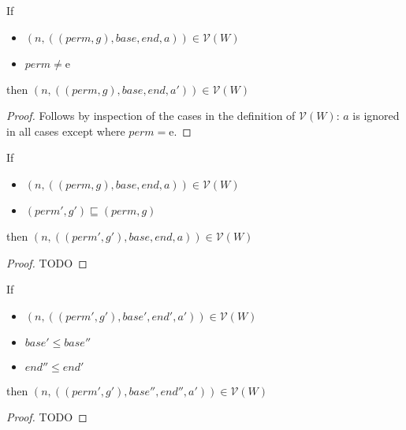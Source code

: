 \documentclass[a4paper]{article}
\newcommand{\var}[1]{\mathit{#1}}
\newcommand{\gl}{\var{g}}
\newcommand{\addr}{\var{a}}
\newcommand{\start}{\var{base}}
\newcommand{\addrend}{\var{end}}
\newcommand{\perm}{\var{perm}}
\newcommand{\asmType}{\plaindom{AsmType}}
\newcommand{\plaindom}[1]{\mathrm{#1}}
\newcommand{\intr}[2]{\mathcal{#1}}
\newcommand{\valueintr}[1]{\intr{V}{#1}}
\newcommand{\stdvr}{\valueintr{\asmType}}
\newcommand{\npair}[2][n]{\left(#1,#2 \right)}
\newcommand{\plainperm}[1]{\mathrm{#1}}
\newcommand{\entry}{\plainperm{e}}
\begin{document}
 \begin{lemma}
   \label{lem:conds-lea-suffice}
   If
   \begin{itemize}
   \item $\npair{((\perm,\gl),\start,\addrend,\addr)}\in\stdvr(W)$
   \item $\perm \neq \entry$
   \end{itemize}
 
   then $\npair{((\perm,\gl),\start,\addrend,\addr')} \in \stdvr(W)$
 \end{lemma}
 \begin{proof}
   Follows by inspection of the cases in the definition of $\stdvr(W)$: $a$ is
   ignored in all cases except where $\perm = \entry$.
 \end{proof}
 
 \begin{lemma}
   \label{lem:conds-restrict-suffice}
   If
   \begin{itemize}
   \item $\npair{((\perm,\gl),\start,\addrend,\addr)}\in\stdvr(W)$
   \item $(\perm',\gl')\sqsubseteq (\perm,\gl)$
   \end{itemize}
 
   then  $\npair{((\perm',\gl'),\start,\addrend,\addr)}\in \stdvr(W)$
 \end{lemma}
 \begin{proof}
   TODO
 \end{proof}
 
 \begin{lemma}
   \label{lem:conds-subseg-suffice}
   If
   \begin{itemize}
   \item $\npair{((\perm',\gl'),\start',\addrend',\addr')} \in \stdvr(W)$
   \item $\start' \leq \start''$
   \item $\addrend'' \leq \addrend'$
   \end{itemize}
 
   then $\npair{((\perm',\gl'),\start'',\addrend'',\addr')} \in \stdvr(W)$
 \end{lemma}
 \begin{proof}
   TODO
 \end{proof}
 
\end{document}
